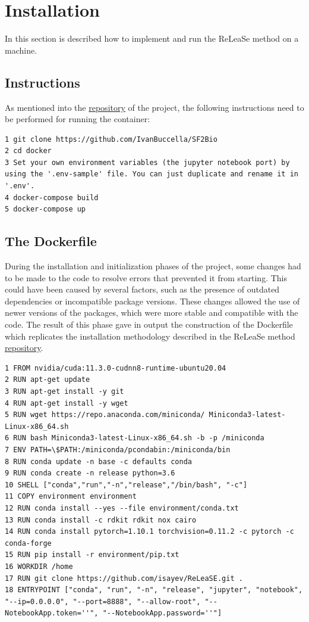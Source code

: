 \documentclass[a4paper]{article}
\begin{document}
\section{Installation}\label{sec:Installation}

In this section is described how to implement and run the ReLeaSe method on a machine.

\subsection{Instructions}\label{sec:Instructions}

As mentioned into the \href{https://github.com/IvanBuccella/SF2Bio#installation}{repository} of the project, the following instructions need to be performed for running the container:

\begin{lstlisting}
1 git clone https://github.com/IvanBuccella/SF2Bio
2 cd docker
3 Set your own environment variables (the jupyter notebook port) by using the '.env-sample' file. You can just duplicate and rename it in '.env'.
4 docker-compose build
5 docker-compose up
\end{lstlisting}

\subsection{The Dockerfile}\label{sec:The Dockerfile}

During the installation and initialization phases of the project, some changes had to be made to the code to resolve errors that prevented it from starting. This could have been caused by several factors, such as the presence of outdated dependencies or incompatible package versions. These changes allowed the use of newer versions of the packages, which were more stable and compatible with the code. 
The result of this phase gave in output the construction of the Dockerfile which replicates the installation methodology described in the ReLeaSe method \href{https://github.com/isayev/ReLeaSE#installation-with-anaconda}{repository}. 

\begin{lstlisting}[label={lst:dockerfile}]
1 FROM nvidia/cuda:11.3.0-cudnn8-runtime-ubuntu20.04
2 RUN apt-get update
3 RUN apt-get install -y git
4 RUN apt-get install -y wget
5 RUN wget https://repo.anaconda.com/miniconda/ Miniconda3-latest-Linux-x86_64.sh
6 RUN bash Miniconda3-latest-Linux-x86_64.sh -b -p /miniconda
7 ENV PATH=\$PATH:/miniconda/pcondabin:/miniconda/bin
8 RUN conda update -n base -c defaults conda
9 RUN conda create -n release python=3.6
10 SHELL ["conda","run","-n","release","/bin/bash", "-c"]
11 COPY environment environment
12 RUN conda install --yes --file environment/conda.txt
13 RUN conda install -c rdkit rdkit nox cairo
14 RUN conda install pytorch=1.10.1 torchvision=0.11.2 -c pytorch -c conda-forge
15 RUN pip install -r environment/pip.txt
16 WORKDIR /home
17 RUN git clone https://github.com/isayev/ReLeaSE.git .
18 ENTRYPOINT ["conda", "run", "-n", "release", "jupyter", "notebook", "--ip=0.0.0.0", "--port=8888", "--allow-root", "--NotebookApp.token=''", "--NotebookApp.password=''"]
\end{lstlisting}
\end{document}
